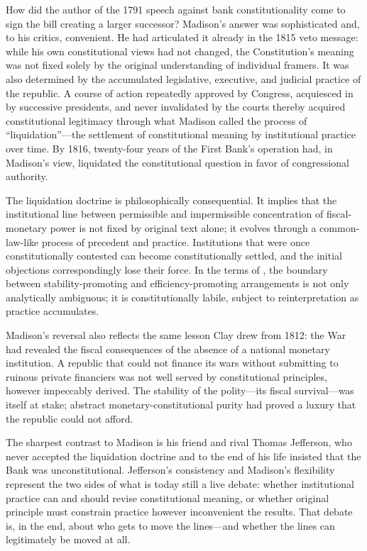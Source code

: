 \documentclass[12pt]{article}
\begin{document}
How did the author of the 1791 speech against bank constitutionality
come to sign the bill creating a larger successor?  Madison's answer
was sophisticated and, to his critics, convenient.
He had articulated it already in the 1815 veto message: while his own
constitutional views had not changed, the Constitution's meaning was
not fixed solely by the original understanding of individual framers.
It was also determined by the accumulated legislative, executive, and
judicial practice of the republic.  A course of action repeatedly
approved by Congress, acquiesced in by successive presidents, and
never invalidated by the courts thereby acquired constitutional
legitimacy through what Madison called the process of
``liquidation''---the settlement of constitutional meaning by
institutional practice over time.  By 1816, twenty-four years of the
First Bank's operation had, in Madison's view, liquidated the
constitutional question in favor of congressional authority.

The liquidation doctrine is philosophically consequential.  It implies
that the institutional line between permissible and impermissible
concentration of fiscal-monetary power is not fixed by original text
alone; it evolves through a common-law-like process of precedent and
practice.  Institutions that were once constitutionally contested can
become constitutionally settled, and the initial objections correspondingly
lose their force.  In the terms of \citet{Sargent2011}, the boundary
between stability-promoting and efficiency-promoting arrangements is not
only analytically ambiguous; it is constitutionally labile, subject to
reinterpretation as practice accumulates.

Madison's reversal also reflects the same lesson Clay drew from 1812:
the War had revealed the fiscal consequences of the absence of a national
monetary institution.  A republic that could not finance its wars
without submitting to ruinous private financiers was not well served by
constitutional principles, however impeccably derived.  The stability
of the polity---its fiscal survival---was itself at stake; abstract
monetary-constitutional purity had proved a luxury that the republic
could not afford.

The sharpest contrast to Madison is his friend and rival Thomas
Jefferson, who never accepted the liquidation doctrine and to the end of
his life insisted that the Bank was unconstitutional.  Jefferson's
consistency and Madison's flexibility represent the two sides of what is
today still a live debate: whether institutional practice can and should
revise constitutional meaning, or whether original principle must
constrain practice however inconvenient the results.  That debate is,
in the end, about who gets to move the lines---and whether the lines
can legitimately be moved at all.
\end{document}
